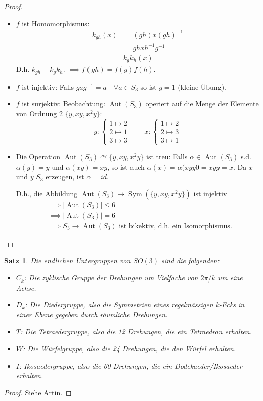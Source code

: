 \documentclass{article}
\theoremstyle{plain}
\newtheorem{theorem}{Satz}
\newcommand{\ug}{\leq}
\newcommand{\sym}{\mathop{\text{Sym}}}
\newcommand{\aut}{\mathop\text{Aut}}
\newcommand{\operateson}{\curvearrowright}
\begin{document}
\begin{proof}
\begin{itemize}
    \item $f$ ist Homomorphismus:
    \begin{align*}
        k_{gh}(x)&=(gh)x(gh)^{-1}\\
        &=ghxh^{-1}g^{-1}\\
        &k_gk_h(x)
    \end{align*}
    D.h. $k_{gh}-k_gk_h$.
    $\implies f(gh)=f(g)f(h)$.
    \item $f$ ist injektiv:
    Falls $gag^{-1}=a\quad \forall a\in S_3$ so ist $g=1$ (kleine Übung).
    \item $f$ ist surjektiv: Beobachtung: $\aut(S_3)$ operiert auf die Menge der Elemente von Ordnung 2 $\{y, xy, x^2y\}$:
    $$y\colon\begin{cases}
        1\mapsto 2\\
        2\mapsto 1\\
        3\mapsto 3
    \end{cases}\qquad
    x\colon\begin{cases}
        1\mapsto 2\\
        2\mapsto 3\\
        3\mapsto 1
    \end{cases}
    $$
    \item Die Operation $\aut(S_3)\operateson \{y,xy,x^2y\}$ ist treu:
    Falls $\alpha\in \aut(S_3)$ s.d. $\alpha(y)=y$ und $\alpha(xy)=xy$, so ist auch $\alpha(x)=\alpha(xyy0=xyy=x$. Da $x$ und $y$ $S_3$ erzeugen, ist $\alpha=id$.
    
    D.h., die Abbildung $\aut(S_3)\to\sym(\{y,xy,x^2y\})$ ist injektiv 
    \begin{align*}
    &\implies|\aut(S_3)|\ug 6\\
    &\implies |\aut(S_3)|=6\\
    &\implies S_3\to \aut(S_3) \text{ ist bikektiv, d.h. ein Isomorphismus.}
    \end{align*}
\end{itemize}
\end{proof}

\begin{theorem}
    Die endlichen Untergruppen von $SO(3)$ sind die folgenden:
    \begin{itemize}
        \item $C_k$: Die zyklische Gruppe der Drehungen um Vielfache von $2\pi/k$ um eine Achse.
        \item $D_k$: Die Diedergruppe, also die Symmetrien eines regelmässigen k-Ecks in einer Ebene gegeben durch räumliche Drehungen.
        \item $T$: Die Tetraedergruppe, also die 12 Drehungen, die ein Tetraedron erhalten.
        \item $W$: Die Würfelgruppe, also die 24 Drehungen, die den Würfel erhalten.
        \item $I$: Ikosaedergruppe, also die 60 Drehungen, die ein Dodekaeder/Ikosaeder erhalten.
    \end{itemize}
\end{theorem}
\begin{proof}
    Siehe Artin.
\end{proof}
\end{document}
